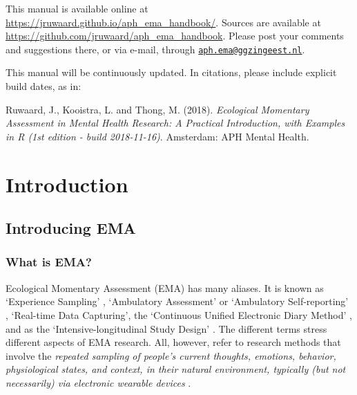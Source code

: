 \documentclass[]{book}
\begin{document}
This manual is available online at
\url{https://jruwaard.github.io/aph_ema_handbook/}. Sources are
available at \url{https://github.com/jruwaard/aph_ema_handbook}. Please
post your comments and suggestions there, or via e-mail, through
\href{mailto:aph.ema@ggzingeest.nl}{\nolinkurl{aph.ema@ggzingeest.nl}}.

This manual will be continuously updated. In citations, please include
explicit build dates, as in:

Ruwaard, J., Kooistra, L. and Thong, M. (2018). \emph{Ecological
Momentary Assessment in Mental Health Research: A Practical
Introduction, with Examples in R (1st edition - build 2018-11-16)}.
Amsterdam: APH Mental Health.

\mainmatter

\part{Introduction}\label{part-introduction}

\chapter{Introducing EMA}\label{introduction}

\section{What is EMA?}\label{what-is-ema}

 

Ecological Momentary Assessment (EMA) has many aliases. It is known as
`Experience Sampling' \citep{Larson1983}, `Ambulatory Assessment'
\citep{EbnerPriemer2009} or `Ambulatory Self-reporting'
\citep{Conner2012a}, `Real-time Data Capturing', the `Continuous Unified
Electronic Diary Method' \citep{EllisDavies2012}, and as the
`Intensive-longitudinal Study Design' \citep{Bolger2013}. The different
terms stress different aspects of EMA research. All, however, refer to
research methods that involve the \emph{repeated sampling of people's
current thoughts, emotions, behavior, physiological states, and context,
in their natural environment, typically (but not necessarily) via
electronic wearable devices} \citep{Shiffman2008}.
\end{document}
